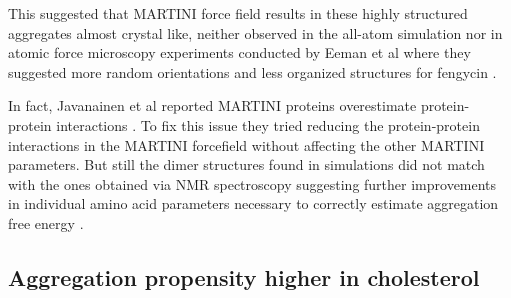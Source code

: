 This suggested that MARTINI force field results in these highly 
structured aggregates almost crystal like, neither observed in the 
all-atom simulation \cite{Grossfield2018} nor in atomic force 
microscopy experiments conducted by Eeman et al where they suggested more random 
orientations and less organized structures for 
fengycin \cite{Dufrene2005}. %

In fact, Javanainen et al reported MARTINI proteins overestimate
protein-protein interactions \cite{Vattulainen2017}.
To fix this issue they tried reducing the protein-protein interactions in the MARTINI forcefield without affecting the other MARTINI parameters. But still the dimer structures found in simulations did not match with the ones obtained via NMR spectroscopy suggesting further improvements in individual amino acid parameters necessary to correctly estimate aggregation free energy \cite{Vattulainen2017}.

\subsection{Aggregation propensity higher in cholesterol}
\label{ss:agg_propensity}


